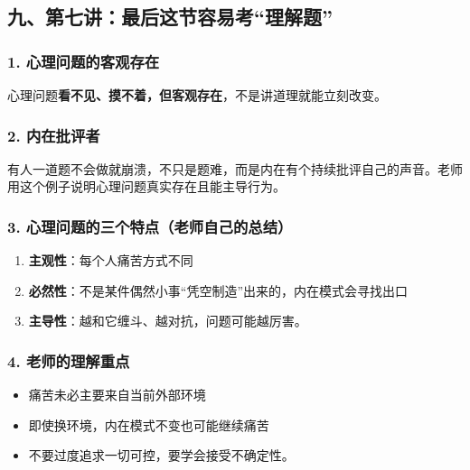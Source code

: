 \documentclass[
  a4paper,
]{ctexart}
\providecommand{\tightlist}{%
  \setlength{\itemsep}{0pt}\setlength{\parskip}{0pt}}
\begin{document}
\subsection{九、第七讲：最后这节容易考``理解题''}\label{ux4e5dux7b2cux4e03ux8bb2ux6700ux540eux8fd9ux8282ux5bb9ux6613ux8003ux7406ux89e3ux9898}

\subsubsection{1.
心理问题的客观存在}\label{ux5fc3ux7406ux95eeux9898ux7684ux5ba2ux89c2ux5b58ux5728}

心理问题\textbf{看不见、摸不着，但客观存在}，不是讲道理就能立刻改变。

\subsubsection{2. 内在批评者}\label{ux5185ux5728ux6279ux8bc4ux8005}

有人一道题不会做就崩溃，不只是题难，而是内在有个持续批评自己的声音。老师用这个例子说明心理问题真实存在且能主导行为。

\subsubsection{3.
心理问题的三个特点（老师自己的总结）}\label{ux5fc3ux7406ux95eeux9898ux7684ux4e09ux4e2aux7279ux70b9ux8001ux5e08ux81eaux5df1ux7684ux603bux7ed3}

\begin{enumerate}
\def\labelenumi{\arabic{enumi}.}
\tightlist
\item
  \textbf{主观性}：每个人痛苦方式不同
\item
  \textbf{必然性}：不是某件偶然小事``凭空制造''出来的，内在模式会寻找出口
\item
  \textbf{主导性}：越和它缠斗、越对抗，问题可能越厉害。
\end{enumerate}

\subsubsection{4.
老师的理解重点}\label{ux8001ux5e08ux7684ux7406ux89e3ux91cdux70b9}

\begin{itemize}
\tightlist
\item
  痛苦未必主要来自当前外部环境
\item
  即使换环境，内在模式不变也可能继续痛苦
\item
  不要过度追求一切可控，要学会接受不确定性。
\end{itemize}
\end{document}
